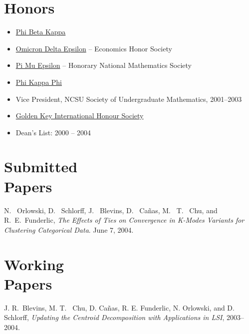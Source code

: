 \documentclass[margin,line,11pt,final]{res}
\begin{document}
\begin{resume}
\section{\sc Honors}
\begin{itemize}
\item \href{http://www.pbk.org/}{Phi Beta Kappa}
\item \href{http://www.cba.ua.edu/~ode/}
  {Omicron Delta Epsilon} -- Economics Honor Society
\item \href{http://www.pme-math.org/}
  {Pi Mu Epsilon} -- Honorary National Mathematics Society
\item \href{http://www.phikappaphi.org/}{Phi Kappa Phi}
\item Vice President, NCSU Society of Undergraduate Mathematics, 2001--2003
\item \href{www.goldenkey.org}{Golden Key International Honour Society}
\item Dean's List: 2000 -- 2004
\end{itemize}


\section{\sc Submitted \\Papers}

N. \ Orlowski, D. \ Schlorff, J. \ Blevins, D. \ Ca\~{n}as, M. \ T. \
Chu, and R.\ E.\ Funderlic, {\em The Effects of Ties on Convergence in
  K-Modes Variants for Clustering Categorical Data}. June 7, 2004.


\section{\sc Working \\Papers}

J. R.\ Blevins, M. T. \ Chu, D. Ca\~{n}as, R. E. Funderlic, N.
Orlowski, and D. Schlorff, {\em Updating the Centroid Decomposition with
  Applications in LSI}, 2003--2004.




\end{resume}
\end{document}
